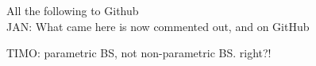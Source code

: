\documentclass[bimj,fleqn]{w-art}\usepackage[]{graphicx}\usepackage[]{color}
\theoremstyle{plain}
\theoremstyle{definition}
\begin{document}
\bigskip

All the following to Github\\
JAN: What came here is now commented out, and on GitHub

TIMO: parametric BS, not non-parametric BS. right?!\\


% 
% 
% 
% 
% 
% 
% 
\end{document}
